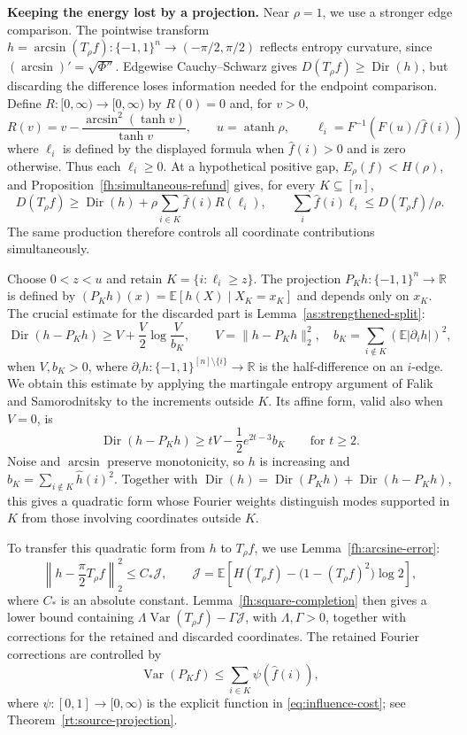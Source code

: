 \documentclass[11pt,letterpaper]{amsart}
\newcommand{\E}{\mathbb E}
\newcommand{\R}{\mathbb R}
\newcommand{\1}{\mathbf 1}
\DeclareMathOperator{\Var}{Var}
\DeclareMathOperator{\atanh}{atanh}
\numberwithin{equation}{section}
\begin{document}
\medskip
\noindent\textbf{Keeping the energy lost by a projection.}
Near $\rho=1$, we use a stronger edge comparison. The pointwise transform
$h=\arcsin(T_\rho f):\{-1,1\}^n\to(-\pi/2,\pi/2)$ reflects entropy curvature, since
$(\arcsin)'=\sqrt{\Phi''}$. Edgewise Cauchy--Schwarz gives
$D(T_\rho f)\ge\operatorname{Dir}(h)$, but discarding the difference
loses information needed for the endpoint comparison.
Define $R:[0,\infty)\to[0,\infty)$ by $R(0)=0$ and, for $v>0$,
\[
 R(v)=v-\frac{\arcsin^2(\tanh v)}{\tanh v},\qquad
 u=\atanh\rho,\qquad \ell_i=F^{-1}(F(u)/\widehat f(i))
\]
where $\ell_i$ is defined by the displayed formula when $\widehat f(i)>0$
and is zero otherwise. Thus each $\ell_i\ge0$. At a hypothetical positive
gap, $E_\rho(f)<H(\rho)$, and
Proposition~\ref{fh:simultaneous-refund} gives, for every $K\subseteq[n]$,
\begin{equation}\label{intro:arcsine}
 D(T_\rho f)\ge\operatorname{Dir}(h)+\rho\sum_{i\in K}\widehat f(i)R(\ell_i),
 \qquad \sum_i \widehat f(i)\ell_i\le D(T_\rho f)/\rho.
\end{equation}
The same production therefore controls all coordinate contributions
simultaneously.

Choose $0<z<u$ and retain
$K=\{i:\ell_i\ge z\}$. The projection
$P_Kh:\{-1,1\}^n\to\R$ is defined by
$(P_Kh)(x)=\E[h(X)\mid X_K=x_K]$ and depends only on $x_K$.
The crucial estimate for the discarded part is
Lemma~\ref{as:strengthened-split}:
\begin{equation}\label{intro:martingale}
 \operatorname{Dir}(h-P_Kh)
 \ge V+\frac V2\log\frac V{b_K},\qquad
 V=\|h-P_Kh\|_2^2,\quad
 b_K=\sum_{i\notin K}(\E|\partial_i h|)^2,
\end{equation}
when $V,b_K>0$, where
$\partial_i h:\{-1,1\}^{[n]\setminus\{i\}}\to\R$
is the half-difference on an $i$-edge. We obtain this estimate by applying the martingale entropy
argument of Falik and Samorodnitsky
\cite[Theorem~2.2 and Lemma~2.3]{FalikSamorodnitsky2007}
to the increments outside $K$.
Its affine form, valid also when $V=0$, is
\[
 \operatorname{Dir}(h-P_Kh)
 \ge tV-\frac12e^{2t-3}b_K \qquad \text{for } t\ge2.
\]
Noise and $\arcsin$ preserve monotonicity, so $h$ is increasing
and $b_K=\sum_{i\notin K}\widehat h(i)^2$.
Together with
$\operatorname{Dir}(h)=\operatorname{Dir}(P_Kh)
+\operatorname{Dir}(h-P_Kh)$, this gives a quadratic form
whose Fourier weights distinguish modes supported in $K$
from those involving coordinates outside $K$.

To transfer this quadratic form from $h$ to $T_\rho f$,
we use Lemma~\ref{fh:arcsine-error}:
\[
 \left\|h-\frac{\pi}{2}T_\rho f\right\|_2^2
 \le C_*\mathcal J,\qquad
 \mathcal J=
 \E\!\left[H(T_\rho f)
       -\bigl(1-(T_\rho f)^2\bigr)\log2\right],
\]
where $C_*$ is an absolute constant.
Lemma~\ref{fh:square-completion} then gives a lower bound
containing $\Lambda\Var(T_\rho f)-\Gamma\mathcal J$,
with $\Lambda,\Gamma>0$, together with corrections for the
retained and discarded coordinates.
The retained Fourier corrections are controlled by
\[
 \Var(P_Kf)\le\sum_{i\in K}\psi(\widehat f(i)),
\]
where $\psi:[0,1]\to[0,\infty)$ is the explicit function in
\eqref{eq:influence-cost}; see Theorem~\ref{rt:source-projection}.
\end{document}
